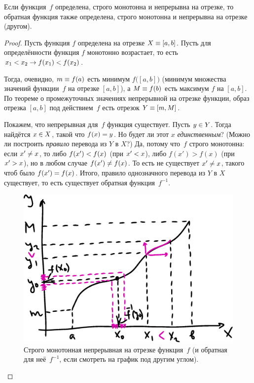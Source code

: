 \documentclass[a4paper,12pt]{article}
\begin{document}
  \begin{proposition}
    Если функция~$f$ определена, строго монотонна и непрерывна на отрезке, то обратная функция также определена, строго монотонна и непрерывна на отрезке (другом).
  \end{proposition}
  
  \begin{proof}
    Пусть функция $f$ определена на отрезке $X \hm\equiv [a, b]$.
    Пусть для определённости функция $f$ монотонно возрастает, то есть $x_1 \hm< x_2 \hm\to f(x_1) \hm< f(x_2)$.
    
    Тогда, очевидно, $m \hm\equiv f(a)$ есть минимум $f\bigl([a, b]\bigr)$ (минимум множества значений функции~$f$ на отрезке $[a, b]$), а $M \hm\equiv f(b)$ есть максимум $f$ на $[a, b]$.
    По теореме о промежуточных значениях непрерывной на отрезке функции, образ отрезка $[a, b]$ под действием~$f$ есть отрезок $Y \hm\equiv [m, M]$.
    
    Покажем, что непрерывная для~$f$ функция существует.
    Пусть $y \hm\in Y$.
    Тогда найдётся $x \hm\in X$, такой что $f(x) \hm= y$.
    Но будет ли этот $x$ \emph{единственным}?
    (Можно ли построить \emph{правило} перевода из $Y$ в $X$?)
    Да, потому что~$f$ строго монотонна: если $x' \hm{\not=} x$, то либо $f(x') \hm< f(x)$ (при $x' \hm< x$), либо $f(x') > f(x)$ (при $x' \hm> x$), но в любом случае $f(x') \hm{\not=} f(x)$.
    То есть не существует $x' \hm{\not=} x$, такого чтоб было $f(x') \hm= f(x)$.
    Итого, правило однозначного перевода из $Y$ в $X$ существует, то есть существует обратная функция~$f^{-1}$.
    
    \begin{figure}[ht]
      \centering
      \includegraphics[width=0.6\linewidth]{images/ff-1}
    
      \caption{
        Строго монотонная непрерывная на отрезке функция~$f$ (и обратная для неё~$f^{-1}$, если смотреть на график под другим углом).
      }
      \label{fig:ff-1}
    \end{figure}
    

\end{proof}
\end{document}
